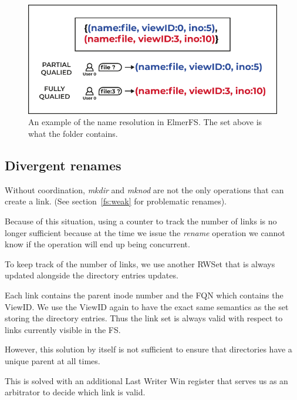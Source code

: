 \documentclass[sigconf, anonymous, 10pt]{acmart}
\begin{document}
\begin{figure}[h]
	\caption{An example of the name resolution in ElmerFS. The set above is
	what the folder contains.}
	\label{fig:fqn}
	\centering
	\includegraphics[scale=0.6]{Le-bonhomme-sait-pas-ce-quil-veut.pdf}
\end{figure}


\subsection{Divergent renames}

Without coordination, \textit{mkdir} and \textit{mknod} are not the only
operations that can create a link. (See section~\ref{fs:weak} for problematic
renames).

Because of this situation, using a counter to track the number of links is no
longer sufficient because at the time we issue the \textit{rename} operation
we cannot know if the operation will end up being concurrent.

To keep track of the number of links, we use another RWSet that is
always updated alongside the directory entries updates.

Each link contains the parent inode number and the FQN which contains
the ViewID.
We use the ViewID again to have the exact same semantics as the set storing
the directory entries. Thus the link set is always valid with respect to
links currently visible in the FS.

However, this solution by itself is not sufficient to ensure that directories have a
unique parent at all times.

This is solved with an additional Last Writer Win register that serves us as
an arbitrator to decide which link is valid.
\end{document}
